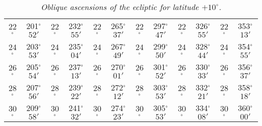 \begin{table}
{\begin{tabular}{cc|cc|cc|cc|cc|cc}
22$^\circ$ & 201$^\circ$$52'$ & 22$^\circ$ & 232$^\circ$$55'$ & 22$^\circ$ & 265$^\circ$$37'$ & 22$^\circ$ & 297$^\circ$$47'$ &  22$^\circ$ & 326$^\circ$$55'$ & 22$^\circ$ & 353$^\circ$$13'$\\
24$^\circ$ & 203$^\circ$$53'$ & 24$^\circ$ & 235$^\circ$$04'$ & 24$^\circ$ & 267$^\circ$$49'$ & 24$^\circ$ & 299$^\circ$$50'$ &  24$^\circ$ & 328$^\circ$$44'$ & 24$^\circ$ & 354$^\circ$$55'$\\
26$^\circ$ & 205$^\circ$$54'$ & 26$^\circ$ & 237$^\circ$$13'$ & 26$^\circ$ & 270$^\circ$$01'$ & 26$^\circ$ & 301$^\circ$$52'$ &  26$^\circ$ & 330$^\circ$$33'$ & 26$^\circ$ & 356$^\circ$$37'$\\
28$^\circ$ & 207$^\circ$$56'$ & 28$^\circ$ & 239$^\circ$$22'$ & 28$^\circ$ & 272$^\circ$$12'$ & 28$^\circ$ & 303$^\circ$$53'$ &  28$^\circ$ & 332$^\circ$$21'$ & 28$^\circ$ & 358$^\circ$$18'$\\
30$^\circ$ & 209$^\circ$$58'$ & 30$^\circ$ & 241$^\circ$$32'$ & 30$^\circ$ & 274$^\circ$$23'$ & 30$^\circ$ & 305$^\circ$$53'$ &  30$^\circ$ & 334$^\circ$$08'$ & 30$^\circ$ & 360$^\circ$$00'$\\
\end{tabular}}
\caption{\em Oblique ascensions of the ecliptic for latitude $+10^\circ$.}\label{tx1}
\end{table}


